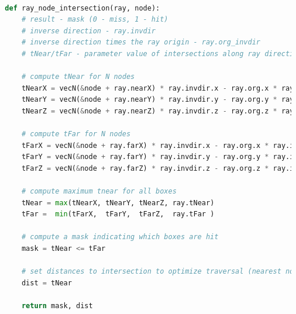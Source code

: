 
      




\begin{lstlisting}[language=Python,basicstyle=\tiny,caption={A non-branching
      ray-node intersection test for a quad tree implementation with pre-computed
      near and far box coordinate values.},
    label={alg:no-branch ray-box optimized},captionpos=b]

  def ray_node_intersection(ray, node):
      # result - mask (0 - miss, 1 - hit)
      # inverse direction - ray.invdir
      # inverse direction times the ray origin - ray.org_invdir
      # tNear/tFar - parameter value of intersections along ray direction
  
      # compute tNear for N nodes
      tNearX = vecN(&node + ray.nearX) * ray.invdir.x - ray.org.x * ray.invdir.x
      tNearY = vecN(&node + ray.nearY) * ray.invdir.y - ray.org.y * ray.invdir.y
      tNearZ = vecN(&node + ray.nearZ) * ray.invdir.z - ray.org.z * ray.invdir.z

      # compute tFar for N nodes
      tFarX = vecN(&node + ray.farX) * ray.invdir.x - ray.org.x * ray.invdir.x
      tFarY = vecN(&node + ray.farY) * ray.invdir.y - ray.org.y * ray.invdir.y
      tFarZ = vecN(&node + ray.farZ) * ray.invdir.z - ray.org.z * ray.invdir.z

      # compute maximum tnear for all boxes
      tNear = max(tNearX, tNearY, tNearZ, ray.tNear) 
      tFar =  min(tFarX,  tFarY,  tFarZ,  ray.tFar )

      # compute a mask indicating which boxes are hit
      mask = tNear <= tFar

      # set distances to intersection to optimize traversal (nearest nodes first)
      dist = tNear

      return mask, dist
\end{lstlisting}


